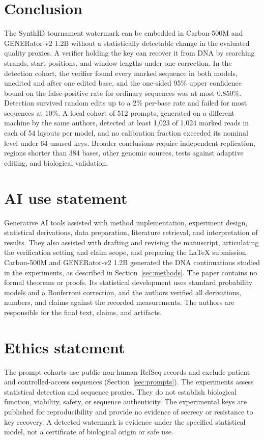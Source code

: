 \documentclass[10pt,twocolumn]{article}
\begin{document}
\section{Conclusion}

The SynthID tournament watermark can be embedded in Carbon-500M and GENERator-v2 1.2B without a
statistically detectable change in the evaluated quality proxies. A verifier holding the key can
recover it from DNA by searching strands, start positions, and window lengths under one
correction. In the detection cohort, the verifier found every marked sequence in both models, unedited
and after one edited base, and the one-sided 95\% upper confidence bound on the false-positive rate
for ordinary sequences was at most 0.850\%. Detection survived random edits up to a 2\% per-base rate
and failed for most sequences at 10\%. A local cohort of 512 prompts, generated on a different
machine by the same authors, detected at least 1{,}023 of 1{,}024 marked reads in each of 54 layouts
per model, and no calibration fraction exceeded its nominal level under 64 unused keys. Broader
conclusions require independent replication, regions shorter than 384 bases, other genomic sources,
tests against adaptive editing, and biological validation.

\section*{AI use statement}

Generative AI tools assisted with method implementation, experiment design, statistical
derivations, data preparation, literature retrieval, and interpretation of results. They also
assisted with drafting and revising the manuscript, articulating the verification setting and
claim scope, and preparing the \LaTeX{} submission. Carbon-500M and GENERator-v2 1.2B generated
the DNA continuations studied in the experiments, as described in Section~\ref{sec:methods}.
The paper contains no formal theorems or proofs. Its statistical development uses standard
probability models and a Bonferroni correction, and the authors verified all derivations,
numbers, and claims against the recorded measurements. The authors are responsible for the final
text, claims, and artifacts.

\section*{Ethics statement}

The prompt cohorts use public non-human RefSeq records and exclude patient and
controlled-access sequences (Section~\ref{sec:prompts}). The experiments assess statistical
detection and sequence proxies. They do not establish biological function, viability, safety, or
sequence authenticity. The experimental keys are published for reproducibility and provide no
evidence of secrecy or resistance to key recovery. A detected watermark is evidence under the
specified statistical model, not a certificate of biological origin or safe use.
\end{document}
